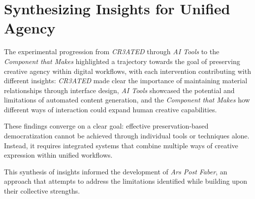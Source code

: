 \section{Synthesizing Insights for Unified Agency}

The experimental progression from \textit{CR3ATED} through \textit{AI Tools} to the \textit{Component that Makes} highlighted a trajectory towards the goal of preserving creative agency within digital workflows, with each intervention contributing with different insights: \textit{CR3ATED} made clear the importance of maintaining material relationships through interface design, \textit{AI Tools} showcased the potential and limitations of automated content generation, and the \textit{Component that Makes} how different ways of interaction could expand human creative capabilities.

\vspace{0.5cm}

These findings converge on a clear goal: effective preservation-based democratization cannot be achieved through individual tools or techniques alone. Instead, it requires integrated systems that combine multiple ways of creative expression within unified workflows.

\vspace{0.5cm}

This synthesis of insights informed the development of \textit{Ars Post Faber}, an approach that attempts to address the limitations identified while building upon their collective strengths.